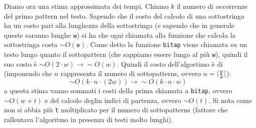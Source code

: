 \documentclass[a4paper,12pt, oneside]{article}
\begin{document}
Diamo ora una stima approssimata dei tempi. Chiamo $k$ il numero di
occorrenze del primo pattern nel testo. Sapendo che il costo del
calcolo di una sottostringa ha un costo pari alla lunghezza della
sottostringa (e sapendo che in generale queste saranno lunghe
\texttt{w}) si ha che ogni chiamata alla funzione che calcola la
sottostringa costa $\sim O(\mathtt{w})$. Come detto la funzione
\texttt{bitap} viene chiamata su un testo lungo quanto il sottopattern
(che sappiamo essere lungo al più \texttt{w}), 
quindi il suo costo è $\sim O(2\cdot w)\to\sim O(w)$. Quindi il costo
dell'algortimo è di (imponendo che $n$ rappresenta il numero di
sottopatterns, ovvero $n=\big\lceil
  \frac{\mathtt{p}}{\mathtt{w}}\big\rceil$):
\[\sim O(k\cdot n\cdot (2w))
  \to\sim O(k\cdot n\cdot w)
\]
a questa stima vanno sommati i costi della prima chiamata a
\texttt{bitap}, ovvero $\sim O(w + t)$ e del calcolo deglin indici di
partenza, ovvero $\sim O(t)$. Si nota come non si abbia più \texttt{t}
moltiplicato per il numero di sottopatterns (fattore che rallentava
l'algoritmo in presenza di testi molto lunghi).
\newpage
\end{document}
